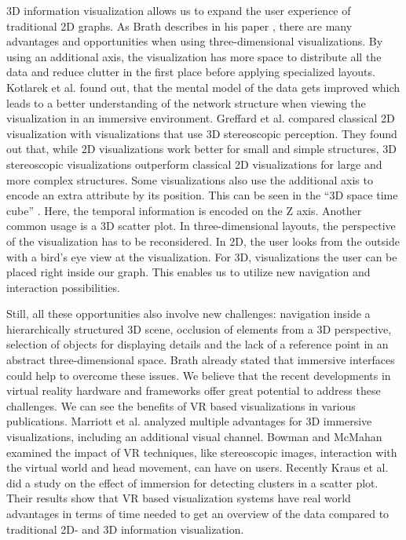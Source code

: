 3D information visualization allows us to expand the user experience of traditional 2D graphs. As Brath describes in his paper \cite{brath_3d_2014}, there are many advantages and opportunities when using three-dimensional visualizations.
By using an additional axis, the visualization has more space to distribute all the data and reduce clutter in the first place before applying specialized layouts. 
Kotlarek et al. \cite{kotlarek_study_2020} found out, that the mental model of the data gets improved which leads to a better understanding of the network structure when viewing the visualization in an immersive environment.
Greffard et al. \cite{greffard_visual_2012} compared classical 2D visualization with visualizations that use 3D stereoscopic perception. They found out that, while 2D visualizations work better for small and simple structures, 3D stereoscopic visualizations outperform classical 2D visualizations for large and more complex structures.
Some visualizations also use the additional axis to encode an extra attribute by its position. This can be seen in the “3D space time cube” \cite{brath_3d_2014}. Here, the temporal information is encoded on the Z axis. Another common usage is a 3D scatter plot.
In three-dimensional layouts, the perspective of the visualization has to be reconsidered. In 2D, the user looks from the outside with a bird's eye view at the visualization. For 3D, visualizations the user can be placed right inside our graph. This enables us to utilize new navigation and interaction possibilities.

Still, all these opportunities also involve new challenges: navigation inside a hierarchically structured 3D scene, occlusion of elements from a 3D perspective, selection of objects for displaying details and the lack of a reference point in an abstract three-dimensional space. Brath \cite{brath_3d_2014} already stated that immersive interfaces could help to overcome these issues.\label{chap:advantages_VR}
We believe that the recent developments in virtual reality hardware and frameworks offer great potential to address these challenges. 
We can see the benefits of VR based visualizations in various publications. 
Marriott et al. \cite{marriott_immersive_2018} analyzed multiple advantages for 3D immersive visualizations, including an additional visual channel.
Bowman and McMahan \cite{bowman_virtual_2007} examined the impact of VR techniques, like stereoscopic images, interaction with the virtual world and head movement, can have on users. 
Recently Kraus et al. \cite{kraus_impact_2020} did a study on the effect of immersion for detecting clusters in a scatter plot. Their results show that VR based visualization systems have real world advantages in terms of time needed to get an overview of the data compared to traditional 2D- and 3D information visualization. 
 

